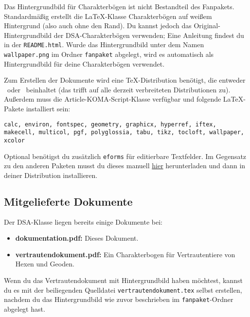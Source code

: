 \documentclass{dsa}
\begin{document}
  Das Hintergrundbild für Charakterbögen ist nicht Bestandteil des Fanpakets.
  Standardmäßig erstellt die \LaTeX-Klasse Charakterbögen auf weißem Hintergrund
  (also auch ohne den Rand). Du kannst jedoch das Original-Hintergrundbild der
  DSA-Charakterbögen verwenden; Eine Anleitung findest du in der \texttt{README.html}.
  Wurde das Hintergrundbild unter dem Namen \texttt{wallpaper.png} im Ordner 
  \texttt{fanpaket} abgelegt, wird es automatisch als Hintergrundbild für deine
  Charakterbögen verwendet.
  
  Zum Erstellen der Dokumente wird eine TeX-Distribution benötigt, die entweder
  \XeLaTeX \ oder \LuaLaTeX \ beinhaltet (das trifft auf alle derzeit verbreiteten
  Distributionen zu). Außerdem muss die Article-KOMA-Script-Klasse verfügbar und
  folgende \LaTeX-Pakete installiert sein:
  
  \vspace{-12pt}
  \begin{flushleft}
    \texttt{calc, environ, fontspec, geometry, graphicx, hyperref, iftex, makecell,
    multicol, pgf, polyglossia, tabu, tikz, tocloft, wallpaper, xcolor}
  \end{flushleft}
  \vspace{-12pt}
  
  Optional benötigst du zusätzlich \texttt{eforms} für editierbare Textfelder.
  Im Gegensatz zu den anderen Paketen musst du dieses manuell
  \href{http://www.ctan.org/pkg/eforms}{hier} herunterladen und dann in deiner
  Distribution installieren.
  
  \subsection*{Mitgelieferte Dokumente}
  
  Der DSA-Klasse liegen bereits einige Dokumente bei:
  
  \begin{itemize}
    \item \textbf{dokumentation.pdf:} Dieses Dokument.
    \item \textbf{vertrautendokument.pdf:} Ein Charakterbogen für
      Vertrautentiere von Hexen und Geoden.
  \end{itemize}
  
  Wenn du das Vertrautendokument mit Hintergrundbild haben möchtest, kannst du
  es mit der beiliegenden Quelldatei \texttt{vertrautendokument.tex} selbst
  erstellen, nachdem du das Hintergrundbild wie zuvor beschrieben im
  \texttt{fanpaket}-Ordner abgelegt hast.
  
\end{document}
